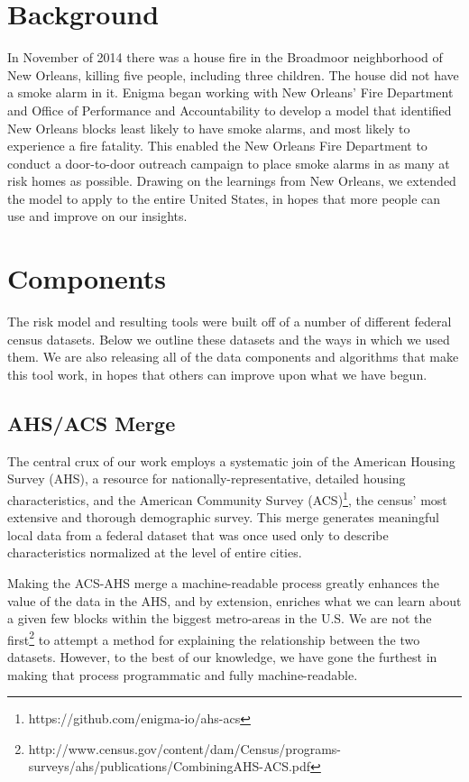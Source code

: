 \documentclass{sig-alternate}
\begin{document}
\section{Background}

In November of 2014 there was a house fire in the Broadmoor neighborhood of New Orleans, killing five people, including three children. The house did not have a smoke alarm in it. Enigma began working with New Orleans' Fire Department and Office of Performance and Accountability to develop a model that identified New Orleans blocks least likely to have smoke alarms, and most likely to experience a fire fatality. This enabled the New Orleans Fire Department to conduct a door-to-door outreach campaign to place smoke alarms in as many at risk homes as possible. Drawing on the learnings from New Orleans, we extended the model to apply to the entire United States, in hopes that more people can use and improve on our insights.


\section{Components}

The risk model and resulting tools were built off of a number of different federal census datasets. Below we outline these datasets and the ways in which we used them. We are also releasing all of the data components and algorithms that make this tool work, in hopes that others can improve upon what we have begun.

\subsection{AHS/ACS Merge}

The central crux of our work employs a systematic join of the American Housing Survey (AHS), a resource for nationally-representative, detailed housing characteristics, and the American Community Survey (ACS)\footnote{https://github.com/enigma-io/ahs-acs}, the census' most extensive and thorough demographic survey. This merge generates meaningful local data from a federal dataset that was once used only to describe characteristics normalized at the level of entire cities.

Making the ACS-AHS merge a machine-readable process greatly enhances the value of the data in the AHS, and by extension, enriches what we can learn about a given few blocks within the biggest metro-areas in the U.S. We are not the first\footnote{http://www.census.gov/content/dam/Census/programs-surveys/ahs/publications/CombiningAHS-ACS.pdf} to attempt a method for explaining the relationship between the two datasets. However, to the best of our knowledge, we have gone the furthest in making that process programmatic and fully machine-readable.
\end{document}
